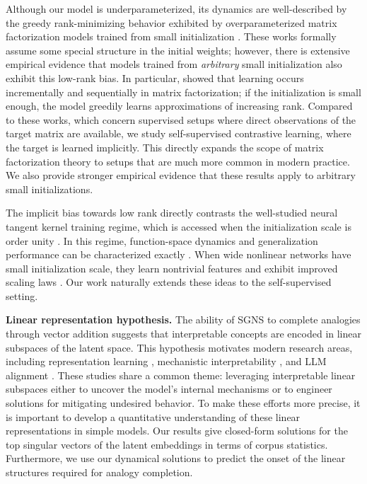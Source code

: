\newpage
Although our model is underparameterized, its dynamics are well-described by the greedy rank-minimizing behavior exhibited by overparameterized matrix factorization models trained from small initialization \citep{gunasekar2017implicit,li2020towards,gidel2019implicit,arora2018optimization,arora2019implicit,li2018algorithmic}.
These works formally assume some special structure in the initial weights; however, there is extensive empirical evidence that models trained from \textit{arbitrary} small initialization also exhibit this low-rank bias. In particular, \cite{gissin2019implicit,li2020towards,jacot2021saddle,simon2023stepwise} showed that learning occurs incrementally and sequentially in matrix factorization; if the initialization is small enough, the model greedily learns approximations of increasing rank. 
Compared to these works, which concern supervised setups where direct observations of the target matrix are available, we study self-supervised contrastive learning, where the target is learned implicitly. This directly expands the scope of matrix factorization theory to setups that are much more common in modern practice.
We also provide stronger empirical evidence that these results apply to arbitrary small initializations.

The implicit bias towards low rank directly contrasts the well-studied neural tangent kernel training regime, which is accessed when the initialization scale is order unity \citep{jacot2018neural,chizat2019lazy,woodworth2020kernel,jacot2021saddle}. In this regime, function-space dynamics and generalization performance can be characterized exactly \citep{lee2019wide,bordelon2020spectrum,simon2023eigenlearning}. When wide nonlinear networks have small initialization scale, they learn nontrivial features and exhibit improved scaling laws  \citep{yang2021tensor,vyas2023empirical,karkada2024lazy,atanasov2024optimization}. Our work naturally extends these ideas to the self-supervised setting.

\textbf{Linear representation hypothesis.} The ability of SGNS to complete analogies through vector addition suggests that interpretable concepts are encoded in linear subspaces of the latent space. This hypothesis motivates modern research areas, including representation learning \citep{jiang2024origins,park2023linear,wang2024concept}, mechanistic interpretability \citep{li2023transformers,nanda2023emergent,lee2024mechanistic}, and LLM alignment \citep{lauscher2020general,li2024inference,zou2023representation}. These studies share a common theme: leveraging interpretable linear subspaces either to uncover the model's internal mechanisms or to engineer solutions for mitigating undesired behavior. To make these efforts more precise, it is important to develop a quantitative understanding of these linear representations in simple models. Our results give closed-form solutions for the top singular vectors of the latent embeddings in terms of corpus statistics. Furthermore, we use our dynamical solutions to predict the onset of the linear structures required for analogy completion.

\clearpage